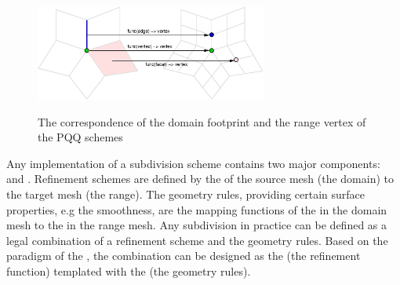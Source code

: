 \begin{figure}
  \centering
  \includegraphics[width=3.0in]{pfigs/PQQRefMap.eps}\\
  \caption{The correspondence of the domain footprint and the 
           range vertex of the PQQ schemes}
  \label{fig:PQQMap}
\end{figure}

Any implementation of a subdivision scheme contains two major
components:  and .
Refinement schemes are defined by the 
 of the source 
mesh (the domain) to the target mesh (the range). The geometry rules,
providing certain surface properties, e.g the smoothness, are the
mapping functions of the  in the domain mesh to the
 in the range mesh. Any subdivision in practice can
be defined as a legal combination of a refinement scheme and the
geometry rules. Based on the paradigm of the
 \cite{a-rotm-02}, the combination can be
designed as the  (the refinement function)
templated with the  (the geometry rules).
